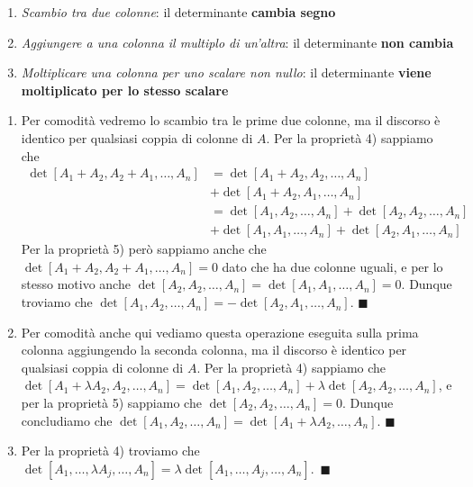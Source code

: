 \documentclass[11pt, a4paper, titlepage, oneside]{scrbook}
\begin{document}
\begin{Proprieta}
\label{prop-oper-elem-determinante}
\begin{enumerate}
    \item \textit{Scambio tra due colonne}: il determinante \textbf{cambia segno}
    \item \textit{Aggiungere a una colonna il multiplo di un'altra}: il determinante \textbf{non cambia}
    \item \textit{Moltiplicare una colonna per uno scalare non nullo}: il determinante \textbf{viene moltiplicato per lo stesso scalare}
\end{enumerate}
\end{Proprieta}

\Dimostrazione \nopagebreak

\begin{enumerate}
    \item Per comodità vedremo lo scambio tra le prime due colonne, ma il discorso è identico per qualsiasi coppia di colonne di $A$. Per la proprietà 4) sappiamo che
    \begin{align*}
    \det [A_1 + A_2, A_2 + A_1, \ldots, A_n] &= \det [A_1 + A_2, A_2, \ldots, A_n] \\
     &+ \det [A_1 + A_2, A_1, \ldots, A_n]  \\
     &= \det [A_1, A_2, \ldots, A_n] + \det [A_2, A_2, \ldots, A_n] \\ 
     &+ \det [A_1, A_1, \ldots, A_n] + \det [A_2, A_1, \ldots, A_n]
    \end{align*}
    Per la proprietà 5) però sappiamo anche che $\det [A_1 + A_2, A_2 + A_1, \ldots, A_n] = 0$  dato che ha due colonne uguali, e per lo stesso motivo anche \mbox{$\det[A_2,A_2, \ldots, A_n] = \det [A_1, A_1, \ldots, A_n] = 0$}. Dunque troviamo che \mbox{$\det[A_1, A_2, \ldots, A_n] = - \det[A_2, A_1, \ldots, A_n]$}. $\blacksquare$
    \item Per comodità anche qui vediamo questa operazione eseguita sulla prima colonna aggiungendo la seconda colonna, ma il discorso è identico per qualsiasi coppia di colonne di $A$.  Per la proprietà 4) sappiamo che \mbox{$\det [A_1 + \lambda A_2, A_2, \ldots, A_n] = \det [A_1, A_2, \ldots, A_n] + \lambda \det [A_2, A_2, \ldots, A_n]$}, e per la proprietà 5) sappiamo che $\det [A_2, A_2, \ldots, A_n] = 0$. Dunque concludiamo che \mbox{$\det [A_1, A_2, \ldots, A_n] = \det [A_1 + \lambda A_2, \ldots, A_n]$}. $\blacksquare$
    \item Per la proprietà 4) troviamo che \mbox{$\det [A_1, \ldots, \lambda A_j, \ldots, A_n] = \lambda \det [A_1, \ldots, A_j, \ldots, A_n]$. $\blacksquare$}
\end{enumerate}
\end{document}

